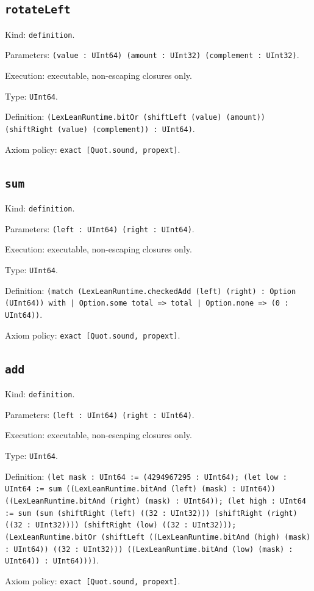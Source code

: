 \documentclass[11pt]{article}
\begin{document}
\subsection*{\texttt{rotateLeft}}
\noindent Kind: \texttt{definition}.\par
\noindent Parameters: \texttt{(value : UInt64) (amount : UInt32) (complement : UInt32)}.\par
\noindent Execution: executable, non-escaping closures only.\par
\noindent Type: \texttt{UInt64}.\par
\noindent Definition: \texttt{(LexLeanRuntime.bitOr (shiftLeft (value) (amount)) (shiftRight (value) (complement)) : UInt64)}.\par
\noindent Axiom policy: \texttt{exact [Quot.sound, propext]}.\par
\subsection*{\texttt{sum}}
\noindent Kind: \texttt{definition}.\par
\noindent Parameters: \texttt{(left : UInt64) (right : UInt64)}.\par
\noindent Execution: executable, non-escaping closures only.\par
\noindent Type: \texttt{UInt64}.\par
\noindent Definition: \texttt{(match (LexLeanRuntime.checkedAdd (left) (right) : Option (UInt64)) with | Option.some total => total | Option.none => (0 : UInt64))}.\par
\noindent Axiom policy: \texttt{exact [Quot.sound, propext]}.\par
\subsection*{\texttt{add}}
\noindent Kind: \texttt{definition}.\par
\noindent Parameters: \texttt{(left : UInt64) (right : UInt64)}.\par
\noindent Execution: executable, non-escaping closures only.\par
\noindent Type: \texttt{UInt64}.\par
\noindent Definition: \texttt{(let mask : UInt64 := (4294967295 : UInt64); (let low : UInt64 := sum ((LexLeanRuntime.bitAnd (left) (mask) : UInt64)) ((LexLeanRuntime.bitAnd (right) (mask) : UInt64)); (let high : UInt64 := sum (sum (shiftRight (left) ((32 : UInt32))) (shiftRight (right) ((32 : UInt32)))) (shiftRight (low) ((32 : UInt32))); (LexLeanRuntime.bitOr (shiftLeft ((LexLeanRuntime.bitAnd (high) (mask) : UInt64)) ((32 : UInt32))) ((LexLeanRuntime.bitAnd (low) (mask) : UInt64)) : UInt64))))}.\par
\noindent Axiom policy: \texttt{exact [Quot.sound, propext]}.\par
\end{document}
